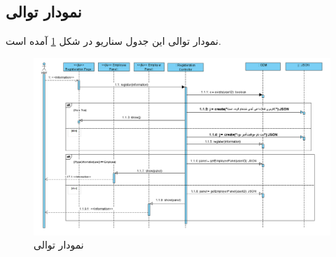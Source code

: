 \subsection{نمودار توالی}
نمودار توالی این جدول سناریو در شکل \ref{pic:sq:7} آمده است.
\begin{figure}
	\begin{center}
		\includegraphics[width=\textwidth, angle=90, height=\textheight]{./images/sd-7}
	\end{center}
	\caption{نمودار توالی }
	\label{pic:sq:7}
\end{figure}
